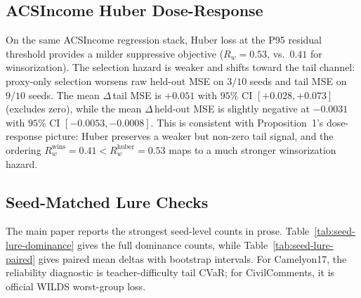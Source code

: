 \subsection{ACSIncome Huber Dose-Response}
\label{app:acsincome-huber}
On the same ACSIncome regression stack, Huber loss at the P95 residual threshold provides a milder suppressive objective ($R_w = 0.53$, vs.\ $0.41$ for winsorization).
The selection hazard is weaker and shifts toward the tail channel: proxy-only selection worsens raw held-out MSE on $3/10$ seeds and tail MSE on $9/10$ seeds.
The mean $\Delta$\,tail MSE is $+0.051$ with $95\%$ CI $[+0.028, +0.073]$ (excludes zero), while the mean $\Delta$\,held-out MSE is slightly negative at $-0.0031$ with $95\%$ CI $[-0.0053, -0.0008]$.
This is consistent with Proposition~1's dose-response picture: Huber preserves a weaker but non-zero tail signal, and the ordering $R_w^{\text{wins}} = 0.41 < R_w^{\text{huber}} = 0.53$ maps to a much stronger winsorization hazard.

\subsection{Seed-Matched Lure Checks}
The main paper reports the strongest seed-level counts in prose.
Table~\ref{tab:seed-lure-dominance} gives the full dominance counts, while Table~\ref{tab:seed-lure-paired} gives paired mean deltas with bootstrap intervals.
For Camelyon17, the reliability diagnostic is teacher-difficulty tail CVaR; for CivilComments, it is official WILDS worst-group loss.

\begin{table}[h]
  \centering
  \small
  \resizebox{\columnwidth}{!}{}
  \caption{
    Seed-level lure counts.
    ``Reliability worse'' means higher teacher-difficulty tail CVaR on Camelyon17 and higher official WILDS worst-group loss on CivilComments.
  }
  \label{tab:seed-lure-dominance}
\end{table}

\begin{table}[h]
  \centering
  \small
  \resizebox{\columnwidth}{!}{}
  \caption{
    Paired mean deltas for the main lure checks.
    ``Reliability'' denotes teacher-difficulty tail CVaR on Camelyon17 and official WILDS worst-group loss on CivilComments; calibration is reported through both ECE and Brier.
  }
  \label{tab:seed-lure-paired}
\end{table}

